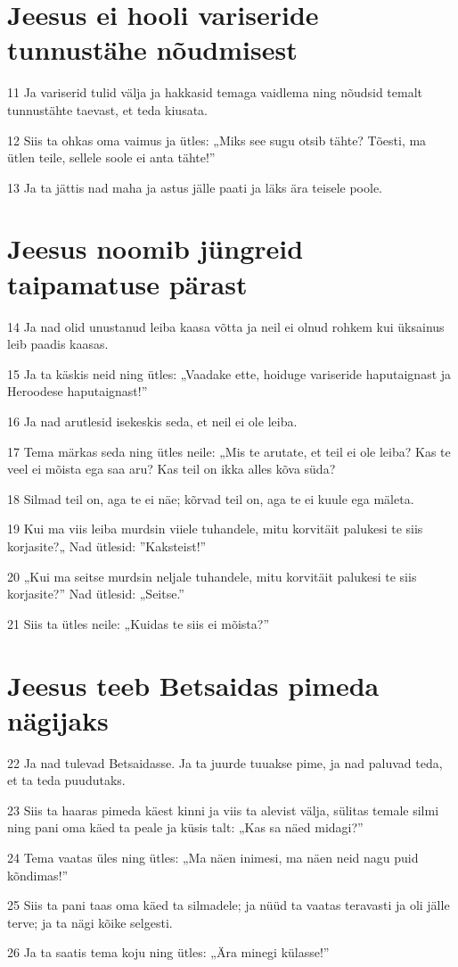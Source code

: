 \section*{Jeesus ei hooli variseride tunnustähe nõudmisest}

\par 11 Ja variserid tulid välja ja hakkasid temaga vaidlema ning nõudsid temalt tunnustähte taevast, et teda kiusata.
\par 12 Siis ta ohkas oma vaimus ja ütles: „Miks see sugu otsib tähte? Tõesti, ma ütlen teile, sellele soole ei anta tähte!”
\par 13 Ja ta jättis nad maha ja astus jälle paati ja läks ära teisele poole.

\section*{Jeesus noomib jüngreid taipamatuse pärast}

\par 14 Ja nad olid unustanud leiba kaasa võtta ja neil ei olnud rohkem kui üksainus leib paadis kaasas.
\par 15 Ja ta käskis neid ning ütles: „Vaadake ette, hoiduge variseride haputaignast ja Heroodese haputaignast!”
\par 16 Ja nad arutlesid isekeskis seda, et neil ei ole leiba.
\par 17 Tema märkas seda ning ütles neile: „Mis te arutate, et teil ei ole leiba? Kas te veel ei mõista ega saa aru? Kas teil on ikka alles kõva süda?
\par 18 Silmad teil on, aga te ei näe; kõrvad teil on, aga te ei kuule ega mäleta.
\par 19 Kui ma viis leiba murdsin viiele tuhandele, mitu korvitäit palukesi te siis korjasite?„ Nad ütlesid: ”Kaksteist!”
\par 20 „Kui ma seitse murdsin neljale tuhandele, mitu korvitäit palukesi te siis korjasite?” Nad ütlesid: „Seitse.”
\par 21 Siis ta ütles neile: „Kuidas te siis ei mõista?”

\section*{Jeesus teeb Betsaidas pimeda nägijaks}

\par 22 Ja nad tulevad Betsaidasse. Ja ta juurde tuuakse pime, ja nad paluvad teda, et ta teda puudutaks.
\par 23 Siis ta haaras pimeda käest kinni ja viis ta alevist välja, sülitas temale silmi ning pani oma käed ta peale ja küsis talt: „Kas sa näed midagi?”
\par 24 Tema vaatas üles ning ütles: „Ma näen inimesi, ma näen neid nagu puid kõndimas!”
\par 25 Siis ta pani taas oma käed ta silmadele; ja nüüd ta vaatas teravasti ja oli jälle terve; ja ta nägi kõike selgesti.
\par 26 Ja ta saatis tema koju ning ütles: „Ära minegi külasse!”

